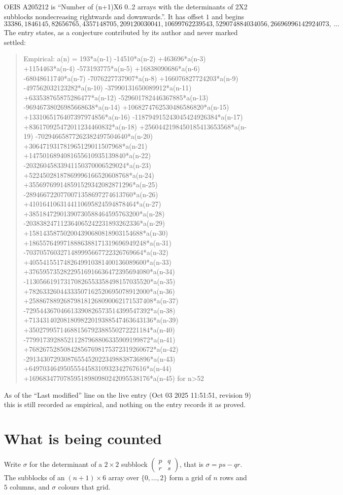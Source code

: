 \documentclass[11pt,a4paper]{article}
\theoremstyle{plain}
\theoremstyle{definition}
\begin{document}
OEIS A205212 is ``Number of (n+1)X6 0..2 arrays with the determinants of 2X2 subblocks nondecreasing rightwards and downwards.''. It has offset $1$ and begins
\[
33386, 1846145, 82656765, 4357148705, 209120030041, 10699762239543, 529074884034056, 26696996142924073,\ \dots
\]
The entry states, as a conjecture contributed by its author and never marked settled:
\begin{quote}
Empirical: a(n) = 193*a(n-1) -14510*a(n-2) +463696*a(n-3) +1154463*a(n-4) -573193775*a(n-5) +16838090686*a(n-6) -68048611740*a(n-7) -7076227737907*a(n-8) +166076827724203*a(n-9) -497562032123282*a(n-10) -37990131650089912*a(n-11) +633538765875286477*a(n-12) -529601782446367885*a(n-13) -96946738026985668638*a(n-14) +1068274762530486586820*a(n-15) +1331065176407397974856*a(n-16) -118794915243045424926384*a(n-17) +836170925472011234460832*a(n-18) +2560442198450185413653568*a(n-19) -70294665877262382497504640*a(n-20) +306471931781965129011507968*a(n-21) +1475016894081655610935139840*a(n-22) -20326045833941150370006529024*a(n-23) +52245028187869996166520608768*a(n-24) +355697699148591529342082871296*a(n-25) -2894667220770071358697274613760*a(n-26) +4101641063144110695824594878464*a(n-27) +38518472901390730588464595763200*a(n-28) -203838247112364065242231893262336*a(n-29) +158143587502004390680818903154688*a(n-30) +1865576499718886388171319696949248*a(n-31) -7037057603271489995667722326769664*a(n-32) +4055415517482649910381400136089600*a(n-33) +37659573528229516916636472395694080*a(n-34) -113056619173170826553358498157035520*a(n-35) +78263326044333507162520695078912000*a(n-36) +258867889268798181268090062171537408*a(n-37) -729544367046613390826573514399547392*a(n-38) +713431402081809822019388547463643136*a(n-39) +35027995714688156792388550272221184*a(n-40) -779917392885211287968806335909199872*a(n-41) +768267528508428567698175372319260672*a(n-42) -291343072930876554520223498838736896*a(n-43) +6497034649505554458310932342767616*a(n-44) +16968347707859518980980242095538176*a(n-45) for n>52
\end{quote}
As of the ``Last modified'' line on the live entry (Oct 03 2025 11:51:51, revision 9) this is still
recorded as empirical, and nothing on the entry records it as proved.

\section{What is being counted}

Write $\sigma$ for the determinant of a $2\times2$ subblock
$\begin{pmatrix}p&q\\r&s\end{pmatrix}$, that is $\sigma=ps-qr$. The subblocks of an
$(n+1)\times6$ array over $\{0,\dots,2\}$ form a grid of $n$ rows and $5$
columns, and $\sigma$ colours that grid.
\end{document}

